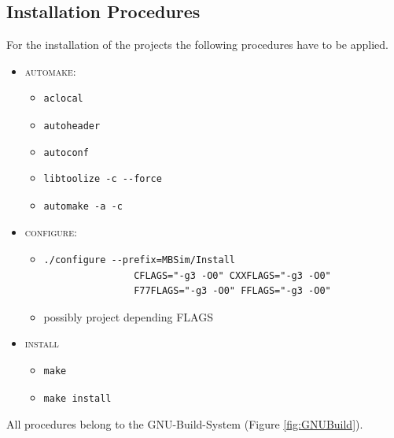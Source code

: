\subsection{Installation Procedures}
For the installation of the projects the following procedures have to be applied.
\begin{itemize}
	\item \textsc{automake}:
	\begin{itemize}
		\item[] \begin{verbatim}aclocal\end{verbatim}
		\item[] \texttt{autoheader}
		\item[] \texttt{autoconf}
		\item[] \begin{verbatim}libtoolize -c --force\end{verbatim}
		\item[] \begin{verbatim}automake -a -c\end{verbatim}
	\end{itemize}
	\item \textsc{configure}: 
	\begin{itemize}
		\item[] \begin{verbatim}./configure --prefix=MBSim/Install
				CFLAGS="-g3 -O0" CXXFLAGS="-g3 -O0"
				F77FLAGS="-g3 -O0" FFLAGS="-g3 -O0"
				\end{verbatim}
		\item[] possibly project depending FLAGS
	\end{itemize}
	\item \textsc{install}
	\begin{itemize}	
		\item \begin{verbatim}make\end{verbatim}
		\item \begin{verbatim}make install\end{verbatim}
	\end{itemize}
\end{itemize}
All procedures belong to the GNU-Build-System (Figure \ref{fig:GNUBuild}).\par
